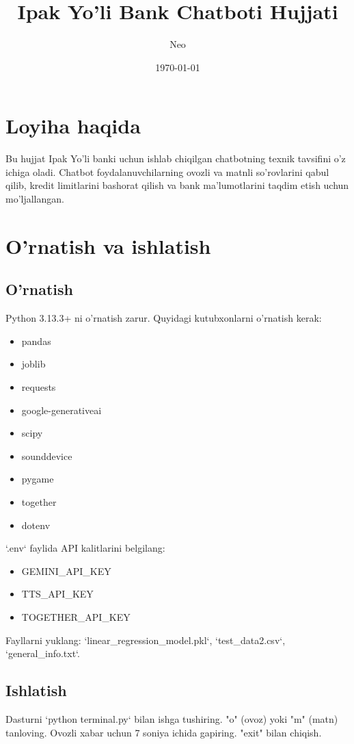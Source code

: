 \documentclass[a4paper,12pt]{article}
\title{Ipak Yo'li Bank Chatboti Hujjati}
\author{Neo}
\date{\today}
\begin{document}
\maketitle

\section{Loyiha haqida}
Bu hujjat Ipak Yo'li banki uchun ishlab chiqilgan chatbotning texnik tavsifini o'z ichiga oladi. Chatbot foydalanuvchilarning ovozli va matnli so'rovlarini qabul qilib, kredit limitlarini bashorat qilish va bank ma'lumotlarini taqdim etish uchun mo'ljallangan.

\section{O'rnatish va ishlatish}
\subsection{O'rnatish}
Python 3.13.3+ ni o'rnatish zarur. Quyidagi kutubxonlarni o'rnatish kerak:
\begin{itemize}
    \item pandas
    \item joblib
    \item requests
    \item google-generativeai
    \item scipy
    \item sounddevice
    \item pygame
    \item together
    \item dotenv
\end{itemize}
`.env` faylida API kalitlarini belgilang:
\begin{itemize}
    \item GEMINI\_API\_KEY
    \item TTS\_API\_KEY
    \item TOGETHER\_API\_KEY
\end{itemize}
Fayllarni yuklang: `linear_regression_model.pkl`, `test_data2.csv`, `general_info.txt`.

\subsection{Ishlatish}
Dasturni `python terminal.py` bilan ishga tushiring. "o" (ovoz) yoki "m" (matn) tanloving. Ovozli xabar uchun 7 soniya ichida gapiring. "exit" bilan chiqish.
\end{document}
